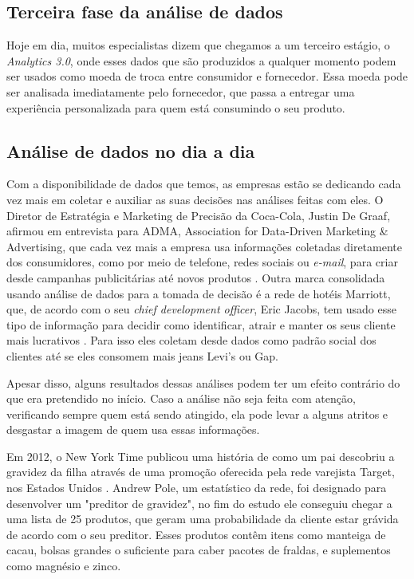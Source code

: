 \subsection{Terceira fase da análise de dados}

\indent
\par Hoje em dia, muitos especialistas dizem que chegamos a um terceiro estágio, o \textit{Analytics 3.0}, onde esses dados que são produzidos a qualquer momento podem ser usados como moeda de troca entre consumidor e fornecedor. Essa moeda pode ser analisada imediatamente pelo fornecedor, que passa a entregar uma experiência personalizada para quem está consumindo o seu produto.

\subsection{Análise de dados no dia a dia}

\indent
\par Com a disponibilidade de dados que temos, as empresas estão se dedicando cada vez mais em coletar e auxiliar as suas decisões nas análises feitas com eles. O Diretor de Estratégia e Marketing de Precisão da Coca-Cola, Justin De Graaf, afirmou em entrevista para ADMA, Association for Data-Driven Marketing \& Advertising, que cada vez mais a empresa usa informações coletadas diretamente dos consumidores, como por meio de telefone, redes sociais ou \textit{e-mail}, para criar desde campanhas publicitárias até novos produtos \cite{Tan2017}. Outra marca consolidada usando análise de dados para a tomada de decisão é a rede de hotéis Marriott, que, de acordo com o seu \textit{chief development officer}, Eric Jacobs, tem usado esse tipo de informação para decidir como identificar, atrair e manter os seus cliente mais lucrativos \cite{Eisen2018}. Para isso eles coletam desde dados como padrão social dos clientes até se eles consomem mais jeans Levi's ou Gap.

\par Apesar disso, alguns resultados dessas análises podem ter um efeito contrário do que era pretendido no início. Caso a análise não seja feita com atenção, verificando sempre quem está sendo atingido, ela pode levar a alguns atritos e desgastar a imagem de quem usa essas informações.

\par Em 2012, o New York Time publicou uma história de como um pai descobriu a gravidez da filha através de uma promoção oferecida pela rede varejista Target, nos Estados Unidos \cite{Duhigg2012}. Andrew Pole, um estatístico da rede, foi designado para desenvolver um "preditor de gravidez", no fim do estudo ele conseguiu chegar a uma lista de 25 produtos, que geram uma probabilidade da cliente estar grávida de acordo com o seu preditor. Esses produtos contêm itens como manteiga de cacau, bolsas grandes o suficiente para caber pacotes de fraldas, e suplementos como magnésio e zinco.

